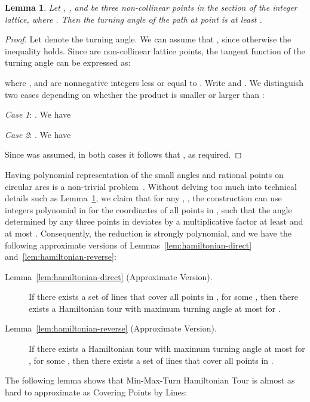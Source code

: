 \documentclass[letterpaper,11pt]{article}
\newtheorem{lemma}{Lemma}
\begin{document}
\begin{lemma}\label{lem:lattice}
Let , , and  be three non-collinear points in the 
section of the integer lattice, where . Then the turning
angle of the path  at point  is at least .
\end{lemma}
\begin{proof}
Let  denote the turning angle. We can assume that , since otherwise the inequality holds.
Since  are non-collinear lattice points,
the tangent function of the turning angle can be expressed as:

where
,
and  are nonnegative integers less or equal to .
Write  and .
We distinguish two cases depending on whether the product  is
smaller or larger than :

{\em Case 1}: . We have


{\em Case 2}: . We have


Since  was assumed,
in both cases it follows that , as required.
\end{proof}

Having polynomial representation of the small angles and rational points
on circular arcs is a non-trivial problem~\cite{CDR92,Bu98}.
Without delving too much into technical details such as Lemma~\ref{lem:lattice},
we claim that for any , ,
the construction can use integers polynomial in 
for the coordinates of all points in ,
such that the angle determined by any three points in  deviates by
a multiplicative factor at least  and at most .
Consequently,
the reduction is strongly polynomial,
and we have the following approximate versions of
Lemmas~\ref{lem:hamiltonian-direct} and~\ref{lem:hamiltonian-reverse}:
\begin{description}

\item[Lemma~\ref{lem:hamiltonian-direct} (Approximate Version).]
If there exists a set of  lines that cover all points in ,
for some ,
then there exists a Hamiltonian tour with maximum turning angle at most
 for .

\item[Lemma~\ref{lem:hamiltonian-reverse} (Approximate Version).]
If there exists a Hamiltonian tour with maximum turning angle at most
 for , for some ,
then there exists a set of  lines that cover all points in .

\end{description}

The following lemma shows that {\sc Min-Max-Turn Hamiltonian Tour}
is almost as hard to approximate as {\sc Covering Points by Lines}:
\end{document}
